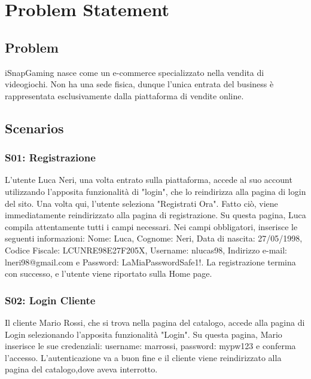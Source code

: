 \documentclass[12pt, a4paper, oneside]{book}
\begin{document}
    \setcounter{tocdepth}{3} %

    \tableofcontents

    \chapter*{Problem Statement}
    \section*{Problem}
        iSnapGaming nasce come un e-commerce specializzato nella vendita di videogiochi. Non ha una sede fisica, dunque l'unica entrata del business è rappresentata esclusivamente dalla piattaforma di vendite online.

    \section*{Scenarios}
        \subsection*{S01: Registrazione}
         L'utente Luca Neri, una volta entrato sulla piattaforma, accede al suo account utilizzando l'apposita funzionalità di "login", che lo
         reindirizza alla pagina di login del sito.
         Una volta qui, l'utente seleziona "Registrati Ora". Fatto ciò, viene immediatamente reindirizzato alla pagina di registrazione.
         Su questa pagina, Luca compila attentamente tutti i campi necessari. Nei campi obbligatori, inserisce le seguenti informazioni:
         Nome: Luca, Cognome: Neri, Data di nascita: 27/05/1998, Codice Fiscale: LCUNRE98E27F205X,
         Username: nlucas98, Indirizzo e-mail: lneri98@gmail.com e Password: LaMiaPasswordSafe1!.
         La registrazione termina con successo, e l’utente viene riportato sulla Home page.

    \subsection*{S02: Login Cliente}
        Il cliente Mario Rossi, che si trova nella pagina del catalogo, accede alla pagina di Login selezionando l'apposita funzionalità "Login".
        Su questa pagina, Mario inserisce le sue credenziali: username: marrossi, password: mypw123 e conferma l'accesso.
        L'autenticazione va a buon fine e il cliente viene reindirizzato alla pagina del catalogo,dove aveva interrotto.
\end{document}
